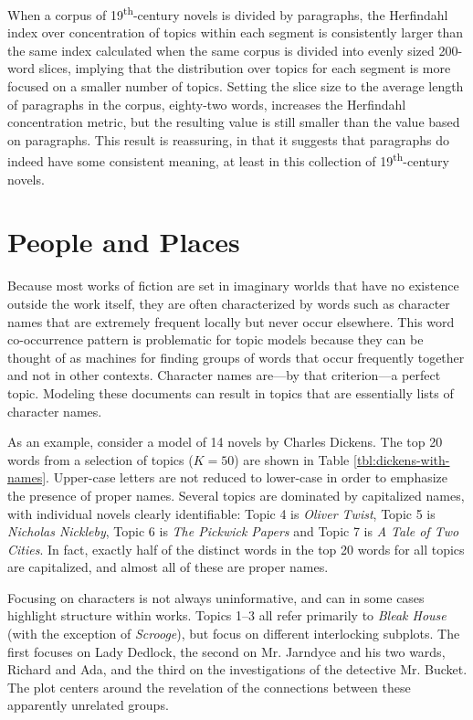 When a corpus of 19\textsuperscript{th}-century novels is divided by paragraphs, the Herfindahl index over concentration of topics within each segment is consistently larger than the same index calculated when the same corpus is divided into evenly sized 200-word slices, implying that the distribution over topics for each segment is more focused on a smaller number of topics.
Setting the slice size to the average length of paragraphs in the corpus, eighty-two words, increases the Herfindahl concentration metric, but the resulting value is still smaller than the value based on paragraphs.
This result is reassuring, in that it suggests that paragraphs do indeed have some consistent meaning, at least in this collection of 19\textsuperscript{th}-century novels.



\section{People and Places}

Because most works of fiction are set in imaginary worlds that have no existence outside the work itself, they are often characterized by words such as character names that are extremely frequent locally but never occur elsewhere.
This word co-occurrence pattern is problematic for topic models because they can be thought of as machines for finding groups of words that occur frequently together and not in other contexts.
Character names are---by that criterion---a perfect topic.
Modeling these documents can result in topics that are essentially lists of character names.

As an example, consider a model of 14 novels by Charles Dickens.
The top 20 words from a selection of topics ($K=50$) are shown in Table \ref{tbl:dickens-with-names}.
Upper-case letters are not reduced to lower-case in order to emphasize the presence of proper names.
Several topics are dominated by capitalized names, with individual novels clearly identifiable: Topic 4 is {\em Oliver Twist}, Topic 5 is {\em Nicholas Nickleby}, Topic 6 is {\em The Pickwick Papers} and Topic 7 is {\em A Tale of Two Cities}.
In fact, exactly half of the distinct words in the top 20 words for all topics are capitalized, and almost all of these are proper names.

Focusing on characters is not always uninformative, and can in some cases highlight structure within works.
Topics 1--3 all refer primarily to {\em Bleak House} (with the exception of {\em Scrooge}), but focus on different interlocking subplots.
The first focuses on Lady Dedlock, the second on Mr. Jarndyce and his two wards, Richard and Ada, and the third on the investigations of the detective Mr. Bucket.
The plot centers around the revelation of the connections between these apparently unrelated groups.

